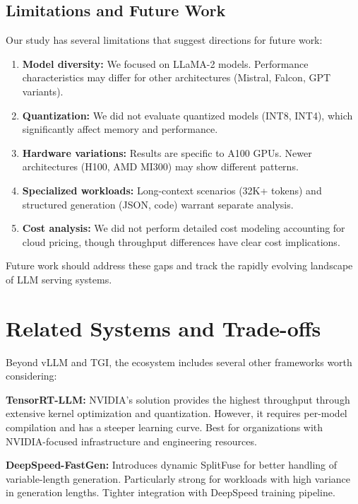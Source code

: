 \documentclass{article}
\begin{document}
\subsection{Limitations and Future Work}

Our study has several limitations that suggest directions for future work:

\begin{enumerate}
    \item \textbf{Model diversity:} We focused on LLaMA-2 models. Performance characteristics may differ for other architectures (Mistral, Falcon, GPT variants).
    
    \item \textbf{Quantization:} We did not evaluate quantized models (INT8, INT4), which significantly affect memory and performance.
    
    \item \textbf{Hardware variations:} Results are specific to A100 GPUs. Newer architectures (H100, AMD MI300) may show different patterns.
    
    \item \textbf{Specialized workloads:} Long-context scenarios (32K+ tokens) and structured generation (JSON, code) warrant separate analysis.
    
    \item \textbf{Cost analysis:} We did not perform detailed cost modeling accounting for cloud pricing, though throughput differences have clear cost implications.
\end{enumerate}

Future work should address these gaps and track the rapidly evolving landscape of LLM serving systems.

\section{Related Systems and Trade-offs}

Beyond vLLM and TGI, the ecosystem includes several other frameworks worth considering:

\textbf{TensorRT-LLM:} NVIDIA's solution provides the highest throughput through extensive kernel optimization and quantization. However, it requires per-model compilation and has a steeper learning curve. Best for organizations with NVIDIA-focused infrastructure and engineering resources.

\textbf{DeepSpeed-FastGen:} Introduces dynamic SplitFuse for better handling of variable-length generation. Particularly strong for workloads with high variance in generation lengths. Tighter integration with DeepSpeed training pipeline.
\end{document}
